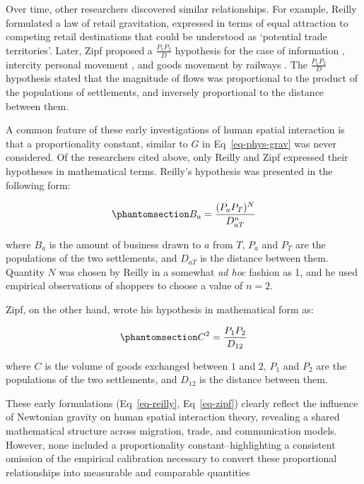 \documentclass[
  10pt,
  letterpaper,
]{article}
\begin{document}
Over time, other researchers discovered similar relationships. For
example, Reilly \citep{reilly1929methods} formulated a law of retail
gravitation, expressed in terms of equal attraction to competing retail
destinations that could be understood as `potential trade territories'.
Later, Zipf proposed a \(\frac{P_1P_2}{D}\) hypothesis for the case of
information \citep{zipfDeterminantsCirculationInformation1946},
intercity personal movement \citep{zipfHypothesisIntercityMovement1946},
and goods movement by railways \citep{zipfHypothesisCaseRailway1946}.
The \(\frac{P_1P_2}{D}\) hypothesis stated that the magnitude of flows
was proportional to the product of the populations of settlements, and
inversely proportional to the distance between them.

A common feature of these early investigations of human spatial
interaction is that a proportionality constant, similar to \(G\) in
Eq~\ref{eq-phys-grav} was never considered. Of the researchers cited
above, only Reilly and Zipf expressed their hypotheses in mathematical
terms. Reilly's hypothesis was presented in the following form:

\begin{equation}\phantomsection\label{eq-reilly}{
B_a = \frac{(P_a P_T)^N}{D_{aT}^n}
}\end{equation}

\noindent where \(B_a\) is the amount of business drawn to \(a\) from
\(T\), \(P_a\) and \(P_T\) are the populations of the two settlements,
and \(D_{aT}\) is the distance between them. Quantity \(N\) was chosen
by Reilly in a somewhat \emph{ad hoc} fashion as 1, and he used
empirical observations of shoppers to choose a value of \(n = 2\).

Zipf, on the other hand, wrote his hypothesis in mathematical form as:

\begin{equation}\phantomsection\label{eq-zipf}{
C^2 = \frac{P_1 P_2}{D_{12}}
}\end{equation}

\noindent where \(C\) is the volume of goods exchanged between \(1\) and
\(2\), \(P_1\) and \(P_2\) are the populations of the two settlements,
and \(D_{12}\) is the distance between them.

These early formulations (Eq~\ref{eq-reilly}, Eq~\ref{eq-zipf}) clearly
reflect the influence of Newtonian gravity on human spatial interaction
theory, revealing a shared mathematical structure across migration,
trade, and communication models. However, none included a
proportionality constant--highlighting a consistent omission of the
empirical calibration necessary to convert these proportional
relationships into measurable and comparable quantities
\end{document}
